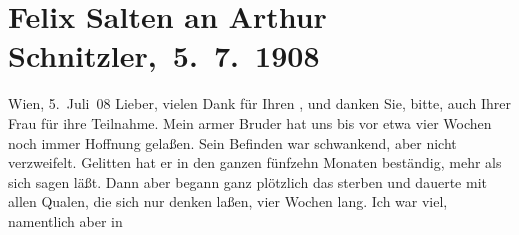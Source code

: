 

         
         \renewcommand{\erwaehntePersonen}{Personen: Felix Salten, Ottilie Salten, Michael Emil Salzmann, Marie Salzmann, Olga Schnitzler}
         \renewcommand{\erwaehnteOrte}{Orte: Bayreuth, Franzensbad, Noordwijk, Salzkammergut, Wien}
         \renewcommand{\erwaehnteWerke}{}
               \section[ Felix Salten an Arthur Schnitzler, 5. 7. 1908]{ Felix Salten an Arthur Schnitzler, 5. 7. 1908}\nopagebreak{}\rehead{ }\begin{ledgroupsized}[t]{13cm}\normalsize\beginnumbering{} \toendnotes[C]{\smallbreak\pagebreak[2]} 
\toendnotes[C]{\smallbreak}\pstart
           \raggedleft{}{\pb}Wien, 5. Juli 08\pend
           \pstart
           Lieber, vielen Dank für Ihren \label{K_L03497-1v}\label{K_L03497-1h}, und danken Sie, bitte, auch Ihrer \label{K_L03497-2v}\label{K_L03497-2h}{ }Frau für ihre Teilnahme. Mein
               armer Bruder hat uns bis vor
               etwa vier Wochen noch immer Hoffnung gelaßen. Sein Befinden war schwankend, aber
               nicht verzweifelt. Gelitten hat er in den ganzen fünfzehn Monaten beständig, mehr als
               sich sagen läßt. Dann aber begann ganz plötzlich das sterben und dauerte mit allen
               Qualen, die sich nur denken laßen, vier Wochen lang. Ich war viel, namentlich aber in

\end{ledgroupsized}
